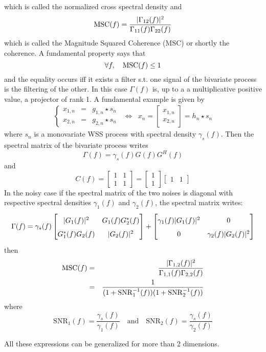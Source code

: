 which is called the  normalized cross spectral density and
\begin{eqnarray}
\label{eq:defMSC}
 \mathrm{MSC}(f)= \frac{|\Gamma_{12}(f)|^{2}}{\Gamma_{11}(f)\Gamma_{22}(f)}
\end{eqnarray}
which is called the Magnitude Squared Coherence (MSC) or shortly the coherence. A fundamental property says that 
$$
 \forall f, \quad \mathrm{MSC}(f)\leq 1
$$
and the equality occurs iff it exists a filter s.t. one signal of the bivariate process is the filtering  of the other. In this case $\Gamma(f)$ is, up to a a multiplicative positive value, a projector of rank 1. A fundamental example is given by
$$
\begin{array}{ccc}
\left\{
 \begin{array}{rcl}
 x_{1,n}&=&g_{1,n}\star s_{n}
 \\
 x_{2,n}&=&g_{2,n}\star s_{n}
\end{array}
\right.
&\Leftrightarrow&
x_{n}=\begin{bmatrix}
x_{1,n}\\ x_{2,n} 
\end{bmatrix} = h_{n} \star s_{n}
\end{array}
$$
where $s_{n}$ is a monovariate WSS process with spectral density $\gamma_{s}(f)$. Then the spectral matrix of the bivariate process writes 
$$
 \Gamma(f)=\gamma_{s}(f)G(f)G^{H}(f)
$$
and
$$
C(f) 
= \begin{bmatrix}1&1\\1&1\end{bmatrix}
= \begin{bmatrix}1\\1\end{bmatrix}
  \begin{bmatrix}1&1\end{bmatrix}
$$
In the noisy case if the spectral matrix of the two noises is diagonal with respective spectral densities $\gamma_{1}(f)$ and  $\gamma_{2}(f)$, the spectral matrix writes:
$$
 \Gamma(f) = \gamma_{s}(f)
 \renewcommand\arraystretch{1.6}
 \begin{bmatrix}
| G_{1}(f)|^{2}& G_{1}(f)G_{2}^{*}(f)
 \\
 G_{1}^{*}(f)G_{2}(f)& | G_{2}(f)|^{2}
 \end{bmatrix}
 +
  \begin{bmatrix}
 \gamma_{1}(f)| G_{1}(f)|^{2}& 0
 \\
 0& \gamma_{2}(f)| G_{2}(f)|^{2}
 \end{bmatrix}
$$
then
\begin{eqnarray*}
 \mathrm{MSC}(f) 
 &=& 
 \frac{|\Gamma_{1,2}(f)|^{2}}{\Gamma_{1,1}(f)\Gamma_{2,2}(f)}
 \\
 &=&
 \frac{1}
   {(1+\mathrm{SNR}_{1}^{-1}(f))(1+\mathrm{SNR}_{2}^{-1}(f))}
\end{eqnarray*}
where
$$
 \mathrm{SNR}_{1}(f)=\frac{\gamma_{s}(f)}{\gamma_{1}(f)}
 \quad\text{and}\quad
 \mathrm{SNR}_{2}(f)=\frac{\gamma_{s}(f)}{\gamma_{2}(f)}
$$

All these expressions can be generalized for more than 2 dimensions.
